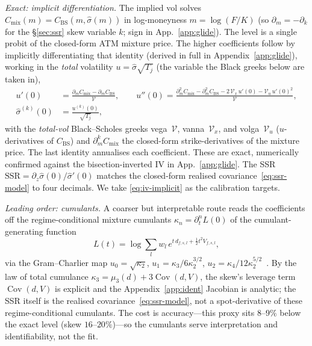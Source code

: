 \documentclass[11pt]{article}
\newcommand{\SSR}{\mathrm{SSR}}
\begin{document}
\emph{Exact: implicit differentiation.} The implied vol solves
$C_{\mathrm{mix}}(m)=C_{\mathrm{BS}}(m,\hat\sigma(m))$ in log-moneyness $m=\log(F/K)$ (so $\partial_m=-\partial_k$ for the §\ref{sec:ssr} skew variable $k$; sign in App.~\ref{app:glide}). The level is a single probit of the closed-form ATM mixture price. The higher coefficients
follow by implicitly differentiating that identity (derived in full in Appendix~\ref{app:glide}),
working in the \emph{total} volatility $u=\hat\sigma\sqrt{T_j}$ (the variable the Black
greeks below are taken in),
\begin{equation}
\begin{aligned}
u'(0)&=\frac{\partial_m C_{\mathrm{mix}}-\partial_m C_{\mathrm{BS}}}{\mathcal V},
\qquad
u''(0)=\frac{\partial_m^2 C_{\mathrm{mix}}-\partial_m^2 C_{\mathrm{BS}}
-2\,\mathcal V_x\,u'(0)-\mathcal V_u\,u'(0)^2}{\mathcal V},\\
\hat\sigma^{(k)}(0)&=\frac{u^{(k)}(0)}{\sqrt{T_j}},
\end{aligned}
\label{eq:iv-implicit}
\end{equation}
with the \emph{total-vol} Black--Scholes greeks vega~$\mathcal V$, vanna~$\mathcal V_x$, and volga~$\mathcal V_u$ ($u$-derivatives of $C_{\mathrm{BS}}$) and $\partial_m^k C_{\mathrm{mix}}$ the closed-form strike-derivatives of the mixture price.
The last identity annualises each coefficient. These
are exact, numerically confirmed against the bisection-inverted IV in App.~\ref{app:glide}. The
SSR $\SSR=\partial_z\hat\sigma(0)/\hat\sigma'(0)$ matches the closed-form realised
covariance~\eqref{eq:ssr-model} to four decimals. We take \eqref{eq:iv-implicit} as the calibration
targets.

\emph{Leading order: cumulants.} A coarser but interpretable route reads the coefficients off
the regime-conditional mixture cumulants $\kappa_n=\partial_t^n L(0)$ of the
cumulant-generating function
\begin{equation}
L(t)=\log\sum_{l} w_l\,e^{t\,d_{f,s,l}+\frac12 t^2 V_{f,s,l}},
\label{eq:cgf}
\end{equation}
via the Gram--Charlier map $u_0=\sqrt{\kappa_2}$, $u_1=\kappa_3/6\kappa_2^{3/2}$,
$u_2=\kappa_4/12\kappa_2^{5/2}$~\cite{corradosu1996,gatheral2006}. By the law of total
cumulance $\kappa_3=\mu_3(d)+3\operatorname{Cov}(d,V)$, the skew's leverage term
$\operatorname{Cov}(d,V)$ is explicit and the Appendix~\ref{app:ident} Jacobian is analytic;
the SSR itself is the realised covariance~\eqref{eq:ssr-model}, not a spot-derivative of
these regime-conditional cumulants. The cost is accuracy---this proxy sits $8$--$9\%$ below
the exact level (skew $16$--$20\%$)---so the cumulants serve interpretation and
identifiability, not the fit.
\end{document}
